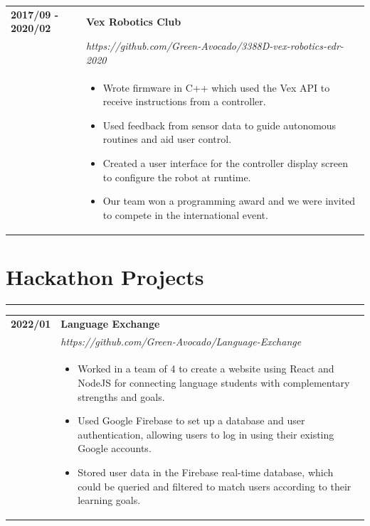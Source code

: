 \documentclass[letterpaper]{article}
\newcommand{\sect}[1]{\section*{#1}
                        {\color{cyan}
                        \rule{\textwidth}{1pt}
                        \vspace{-1ex}}}
\begin{document}
        \begin{tabular}{p{} p{}}
            \textbf{2017/09 - 2020/02} & \textbf{Vex Robotics Club} \\
            & \emph{https://github.com/Green-Avocado/3388D-vex-robotics-edr-2020} \\
            & \begin{itemize}
                \item Wrote firmware in C++ which used the Vex API to receive instructions from a
                    controller.
                \item Used feedback from sensor data to guide autonomous routines and aid user control.
                \item Created a user interface for the controller display screen to configure the robot at
                    runtime.
                \item Our team won a programming award and we were invited to compete in the international
                    event.
            \end{itemize}
        \end{tabular}

    \sect{Hackathon Projects}

        \begin{tabular}{p{} p{}}
            \textbf{2022/01} & \textbf{Language Exchange} \\
            & \emph{https://github.com/Green-Avocado/Language-Exchange} \\
            & \begin{itemize}
                \item Worked in a team of 4 to create a website using React and NodeJS for connecting
                    language students with complementary strengths and goals.
                \item Used Google Firebase to set up a database and user authentication, allowing users to
                    log in using their existing Google accounts.
                \item Stored user data in the Firebase real-time database, which could be queried and
                    filtered to match users according to their learning goals.
            \end{itemize}
            \\
        \end{tabular}
\end{document}
